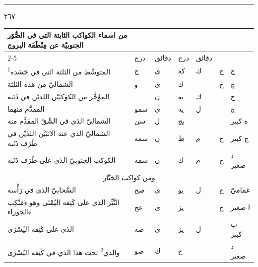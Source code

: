 \documentclass[11pt]{article}
\newcommand{\AbjadZero}{{\NallinoSigns\symbol{"E000}}}
\begin{document}
\par\vspace{3mm}\noindent\rule{40mm}{.4pt}\par{}
\clearpage
{\large \textarabic{٢٦٧}}\par\vspace{2mm}
\begin{Arabic}\begin{tabular}{|p{84mm}|>{\centering\arraybackslash}p{9mm}|>{\centering\arraybackslash}p{9mm}|>{\centering\arraybackslash}p{9mm}|>{\centering\arraybackslash}p{9mm}|>{\centering\arraybackslash}p{14mm}|>{\centering\arraybackslash}p{17mm}|}\hline
\multirow{2}{*}{\parbox{80mm}{\centering من اسماء الكواكب الثابتة التي في الصُّوَر الجنوبيّة عن مِنْطَقَة البروج}} & \multicolumn{2}{c|}{الطول} & \multicolumn{2}{c|}{العرض} & \multirow{2}{*}{\parbox{13mm}{\centering\small علامات الجهة}} & \multirow{2}{*}{\parbox{16mm}{\centering\small مراتب العظمة}} \\ \cline{2-5}
 & {\small درج} & {\small دقائق} & {\small درج} & {\small دقائق} & & \\ \hline
المتوسِّط من الثلثة التي في جَسَده\textsuperscript{1} & ج & ى & كه & ك & ج & ج \\
الشماليّ من هذه الثلثة & و & ى & ك & \AbjadZero{} & ج & ج \\
المؤَخَّر من الكوكبَيْن اللذيْن في ذَنَبه & \AbjadZero{} & ن & يه & ك &  & ج \\
المقدَّم منهما & سمو & ى & يه & ل &  & ج \\
الشماليّ الذي في الشِّقّ المقدَّم منه & سن & ل & يج & \AbjadZero{} &  & ه كبير \\
الشماليّ الذي عند الاثنَيْن اللذيْن في طَرَف ذَنَبه & سمه & ن & ط & م & ج & ج كبير \\
الكوكب الجنوبيّ الذي على طَرَف ذَنَبه & سمه & ن & ك & م & ج & د صغير \\
\hline
\multicolumn{7}{|c|}{\large ومن كواكب الجَبَّار} \\ \hline
السَّحابيّ الذي في رَأْسه & صح & ى & يو & ل & ج & غماميّ \\
النَّيِّر الذي على كَتِفه اليُمْنَى وهو ﴿مَنْكِب الجوزاء﴾ & عج & ى & يز & \AbjadZero{} & ج & ا صغير \\
الذي على كَتِفه اليُسْرَى & صه & ى & يز & ل &  & ب كبير \\
والذي\textsuperscript{2} تحت هذا الذي في كَتِفه اليُسْرَى & صو & ك & ح & \AbjadZero{} &  & د صغير \\

\end{tabular}
\end{Arabic}
\end{document}
